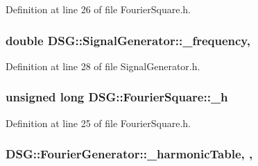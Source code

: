 Definition at line 26 of file Fourier\+Square.\+h.

\hypertarget{classDSG_1_1SignalGenerator_a67e296e3506dcdf09402c667cddff9ac}{
\subsubsection[{\+\_\+frequency}]{\setlength{\rightskip}{0pt plus 5cm}double D\+S\+G\+::\+Signal\+Generator\+::\+\_\+frequency\hspace{0.3cm}{\ttfamily [protected]}, {\ttfamily [inherited]}}}\label{classDSG_1_1SignalGenerator_a67e296e3506dcdf09402c667cddff9ac}


Definition at line 28 of file Signal\+Generator.\+h.

\hypertarget{classDSG_1_1FourierSquare_a2b82df6091ad654fe59a44ff6e18a363}{
\subsubsection[{\+\_\+h}]{\setlength{\rightskip}{0pt plus 5cm}unsigned long D\+S\+G\+::\+Fourier\+Square\+::\+\_\+h\hspace{0.3cm}{\ttfamily [protected]}}}\label{classDSG_1_1FourierSquare_a2b82df6091ad654fe59a44ff6e18a363}


Definition at line 25 of file Fourier\+Square.\+h.

\hypertarget{classDSG_1_1FourierGenerator_a7288408f8e44d5edb5eecc62480243d7}{
\subsubsection[{\+\_\+harmonic\+Table}]{ D\+S\+G\+::\+Fourier\+Generator\+::\+\_\+harmonic\+Table\hspace{0.3cm}{\ttfamily [static]}, {\ttfamily [protected]}, {\ttfamily [inherited]}}}\label{classDSG_1_1FourierGenerator_a7288408f8e44d5edb5eecc62480243d7}


